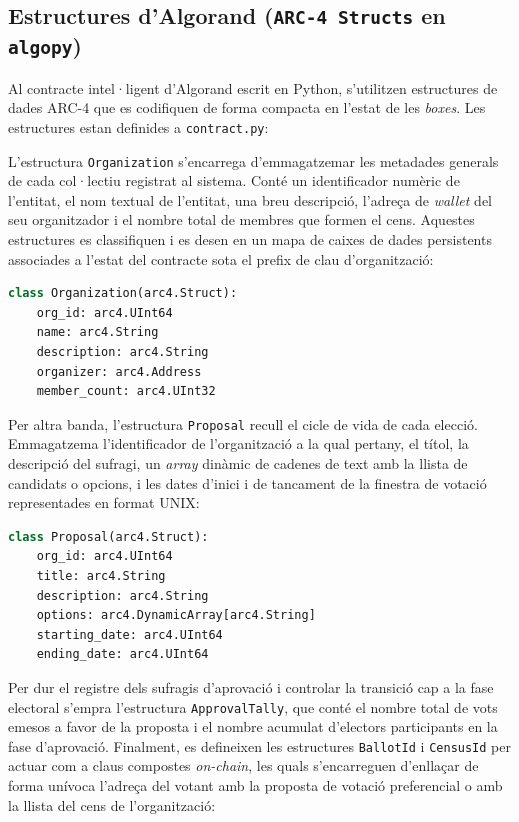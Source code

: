 \subsection{Estructures d'Algorand (\texttt{ARC-4 Structs} en \texttt{algopy})}
\label{subsec:estructs-algorand}

Al contracte intel·ligent d'Algorand escrit en Python, s'utilitzen estructures de dades \ac{ARC}-4 que es codifiquen de
forma compacta en l'estat de les \textit{boxes}.
Les estructures estan definides a \texttt{contract.py}:

L'estructura \texttt{Organization} s'encarrega d'emmagatzemar les metadades generals de cada col·lectiu registrat al
sistema.
Conté un identificador numèric de l'entitat, el nom textual de l'entitat, una breu descripció, l'adreça de
\textit{wallet} del seu organitzador i el nombre total de membres que formen el cens.
Aquestes estructures es classifiquen i es desen en un mapa de caixes de dades persistents associades a l'estat del
contracte sota el prefix de clau d'organització:

\begin{lstlisting}[language=Python]
class Organization(arc4.Struct):
    org_id: arc4.UInt64
    name: arc4.String
    description: arc4.String
    organizer: arc4.Address
    member_count: arc4.UInt32
\end{lstlisting}

Per altra banda, l'estructura \texttt{Proposal} recull el cicle de vida de cada elecció.
Emmagatzema l'identificador de l'organització a la qual pertany, el títol, la descripció del sufragi, un \textit{array}
dinàmic de cadenes de text amb la llista de candidats o opcions, i les dates d'inici i de tancament de la finestra de
votació representades en format UNIX:

\begin{lstlisting}[language=Python]
class Proposal(arc4.Struct):
    org_id: arc4.UInt64
    title: arc4.String
    description: arc4.String
    options: arc4.DynamicArray[arc4.String]
    starting_date: arc4.UInt64
    ending_date: arc4.UInt64
\end{lstlisting}

Per dur el registre dels sufragis d'aprovació i controlar la transició cap a la fase electoral s'empra l'estructura
\texttt{ApprovalTally}, que conté el nombre total de vots emesos a favor de la proposta i el nombre acumulat d'electors
participants en la fase d'aprovació.
Finalment, es defineixen les estructures \texttt{BallotId} i \texttt{CensusId} per actuar com a claus compostes
\textit{on-chain}, les quals s'encarreguen d'enllaçar de forma unívoca l'adreça del votant amb la proposta de votació
preferencial o amb la llista del cens de l'organització:

